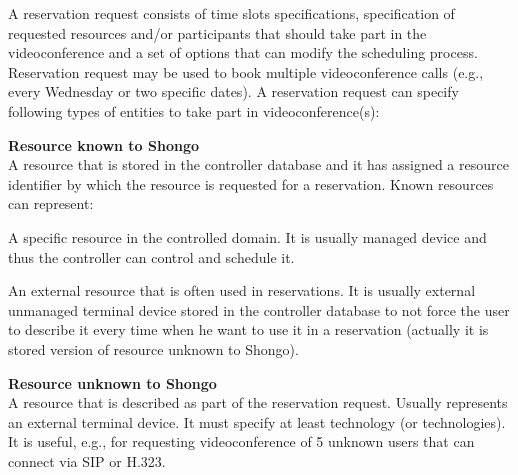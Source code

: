 A reservation request consists of time slots specifications, specification of requested resources and/or participants that should take part in the videoconference and a set of options that can modify the scheduling process. Reservation request may be used to book multiple videoconference calls (e.g., every Wednesday or two specific dates). A reservation request can specify following types of entities to take part in videoconference(s):
\begin{compactenum}
\item \textbf{Resource known to Shongo} \\
  A resource that is stored in the controller database and it has assigned 
  a resource identifier by which the resource is requested for 
  a reservation. Known resources can represent:
  \begin{compactenum}
  \item A specific resource in the controlled domain. It is usually 
  managed device and thus the controller can control and schedule it.
  \item An external resource that is often used in reservations. It is 
  usually external unmanaged terminal device stored in the controller database
  to not force the user to describe it every time when he want to use it in 
  a reservation (actually it is stored version of resource unknown to Shongo).
  \end{compactenum}
\item \textbf{Resource unknown to Shongo} \\
  A resource that is described as part of the reservation request. Usually 
  represents an external terminal device. It must specify at least technology 
  (or technologies). It is useful, e.g., for requesting videoconference 
  of 5 unknown users that can connect via SIP or H.323.
  

\end{compactenum}

